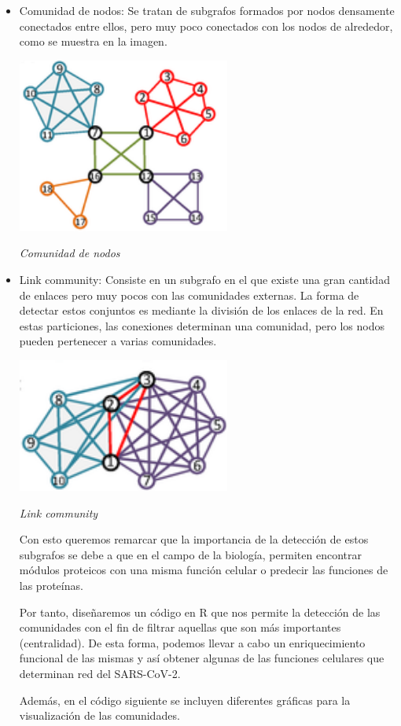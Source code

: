 \begin{itemize}
\item Comunidad de nodos: Se tratan de subgrafos formados por nodos densamente conectados entre ellos, pero muy poco conectados con los nodos de alrededor, 
como se muestra en la imagen. 


\begin{center}

\includegraphics[width=70mm,scale=1.2]{report/figures/nodes.png}

\caption{\textit{Comunidad de nodos}}

\end{center}


\item Link community: Consiste en un subgrafo en el que existe una gran cantidad de enlaces pero muy pocos con las comunidades externas. 
La forma de detectar estos conjuntos es mediante la división de los enlaces de la red. En estas particiones, las conexiones determinan una comunidad, 
pero los nodos pueden pertenecer a varias comunidades. 


\begin{center}
\includegraphics[width=70mm,scale=1.2]{report/figures/links.png}


\caption{\textit{Link community}}

\end{center}

Con esto queremos remarcar que la importancia de la detección de estos subgrafos se debe a que en el campo de la biología, permiten encontrar módulos proteicos con una misma
función celular o predecir las funciones de las proteínas.

Por tanto, diseñaremos un código en R que nos permite la detección de las comunidades con el fin de filtrar aquellas que son más importantes (centralidad). De esta forma,
podemos llevar a cabo un enriquecimiento funcional de las mismas y así obtener algunas de las funciones celulares que determinan red del SARS-CoV-2.

Además, en el código siguiente se incluyen diferentes gráficas para la visualización de las comunidades.
\end{itemize}

